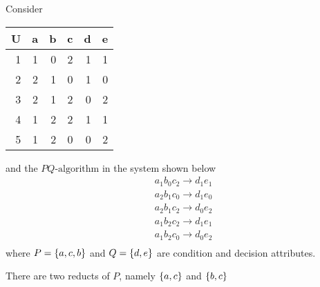 \documentclass[11pt]{article}
\begin{document}
Consider
\begin{center}
\begin{tabular}{rrrrrr}
U & a & b & c & d & e\\
\hline
1 & 1 & 0 & 2 & 1 & 1\\
2 & 2 & 1 & 0 & 1 & 0\\
3 & 2 & 1 & 2 & 0 & 2\\
4 & 1 & 2 & 2 & 1 & 1\\
5 & 1 & 2 & 0 & 0 & 2\\
\end{tabular}
\end{center}
and the \(PQ\text{-algorithm}\) in the system shown below
\begin{align*}
  &a_1b_0c_2\to d_1e_1\\
  &a_2b_1c_0\to d_1e_0\\
  &a_2b_1c_2\to d_0e_2\\
  &a_1b_2c_2\to d_1e_1\\
  &a_1b_2c_0\to d_0e_2\\
\end{align*}
where \(P=\left\{ a,c,b\right\}\) and \(Q=\left\{ d,e\right\}\) are condition and decision
attributes.

There are two reducts of \(P\), namely \(\left\{ a,c\right\}\) and \(\left\{ b,c\right\}\)
\end{document}
